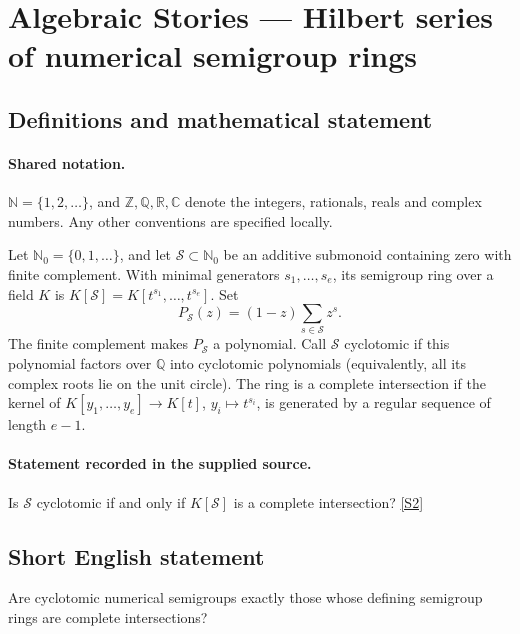 \documentclass[11pt]{article}
\newcommand{\sref}[2]{\hyperlink{source:#1:#2}{[S#2]}}
\begin{document}
\section{Algebraic Stories — Hilbert series of numerical semigroup rings}\label{statement}

\subsection{Definitions and mathematical statement}

\paragraph{Shared notation.}$\mathbb N=\{1,2,\ldots\}$, and $\mathbb Z,\mathbb Q,\mathbb R,\mathbb C$ denote the integers, rationals, reals and complex numbers. Any other conventions are specified locally.


Let $\mathbb N_0=\{0,1,\ldots\}$, and let $\mathcal S\subset\mathbb N_0$ be an additive submonoid containing zero with finite complement. With minimal generators $s_1,\ldots,s_e$, its semigroup ring over a field $K$ is $K[\mathcal S]=K[t^{s_1},\ldots,t^{s_e}]$. Set
\[P_{\mathcal S}(z)=(1-z)\sum_{s\in\mathcal S}z^s.
\]
The finite complement makes $P_{\mathcal S}$ a polynomial. Call $\mathcal S$ cyclotomic if this polynomial factors over $\mathbb Q$ into cyclotomic polynomials (equivalently, all its complex roots lie on the unit circle). The ring is a complete intersection if the kernel of $K[y_1,\ldots,y_e]\to K[t]$, $y_i\mapsto t^{s_i}$, is generated by a regular sequence of length $e-1$.
\paragraph{Statement recorded in the supplied source.}
Is $\mathcal S$ cyclotomic if and only if $K[\mathcal S]$ is a complete intersection? \sref{statement}{2}
\subsection{Short English statement}
Are cyclotomic numerical semigroups exactly those whose defining semigroup rings are complete intersections?
\end{document}

